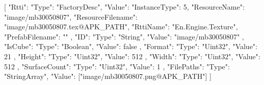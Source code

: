 [{
        "Rtti": {
            "Type": "FactoryDesc",
            "Value": {
                "InstanceType": 5,
                "ResourceName": "image/mb30050807",
                "ResourceFilename": "image/mb30050807.tex@APK_PATH",
                "RttiName": "En.Engine.Texture",
                "PrefabFilename": ""
            }
        },
        "ID": {
            "Type": "String",
            "Value": "image/mb30050807"
        },
        "IsCube": {
            "Type": "Boolean",
            "Value": false
        },
        "Format": {
            "Type": "Uint32",
            "Value": 21
        },
        "Height": {
            "Type": "Uint32",
            "Value": 512
        },
        "Width": {
            "Type": "Uint32",
            "Value": 512
        },
        "SurfaceCount": {
            "Type": "Uint32",
            "Value": 1
        },
        "FilePaths": {
            "Type": "StringArray",
            "Value": ["image/mb30050807.png@APK_PATH"]
        }
    }]